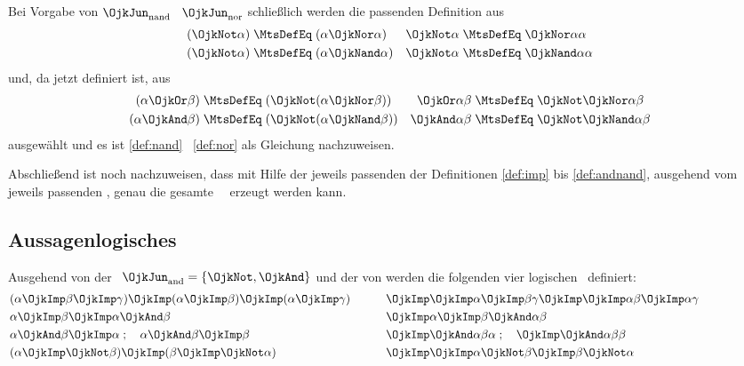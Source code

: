 {Bei Vorgabe von $\OjkJun_{\RawMtsIdxNand}$ \textbzgl\ $\OjkJun_{\RawMtsIdxNor}$ schließlich werden die passenden Definition aus
\begin{align}
(\OjkNot \alpha) & \;\MtsDefEq\; (\alpha \OjkNor \alpha)  &
\OjkNot  \alpha  & \;\MtsDefEq\;  \OjkNor \alpha \alpha   \label{def:notnor} \\
(\OjkNot \alpha) & \;\MtsDefEq\; (\alpha \OjkNand \alpha) &
\OjkNot  \alpha  & \;\MtsDefEq\;  \OjkNand \alpha \alpha  \label{def:notnand}
\end{align}
und, da \chrqt{\OjkNot} jetzt definiert ist, aus
\begin{align}
(\alpha \OjkOr \beta)  & \;\MtsDefEq\; (\OjkNot(\alpha \OjkNor \beta))  &
\OjkOr \alpha  \beta   & \;\MtsDefEq\;  \OjkNot \OjkNor \alpha \beta
\label{def:ornor} \\
(\alpha \OjkAnd \beta) & \;\MtsDefEq\; (\OjkNot(\alpha \OjkNand \beta)) &
\OjkAnd \alpha  \beta  & \;\MtsDefEq\;  \OjkNot \OjkNand \alpha \beta
\label{def:andnand}
\end{align}
ausgewählt und es ist \eqref{def:nand} \textbzgl\ \eqref{def:nor} als Gleichung nachzuweisen.

Abschließend ist noch nachzuweisen, dass mit Hilfe der jeweils passenden der Definitionen \eqref{def:imp} bis \eqref{def:andnand}, ausgehend vom jeweils passenden \OjkForx, genau die gesamte \Formelmenge\ \OjkFor\ erzeugt werden kann.

\subsection[Aussagenlogisches Axiomensystem]{Aussagenlogisches \Axiomensystem}%
\label                   {sub:Axiome}

Ausgehend von der \logischenSignatur\ $\OjkJun_{\RawMtsIdxAnd} = \{\OjkNot, \OjkAnd\}$ und der  von \chrqt{\OjkImp} werden die folgenden vier logischen \Axiome\ definiert:
\begin{align}
&
(\alpha\OjkImp\beta\OjkImp\gamma)\OjkImp(\alpha\OjkImp\beta)\OjkImp(\alpha\OjkImp\gamma)
\formulaspace &
& \OjkImp\OjkImp\alpha\OjkImp\beta\gamma\OjkImp\OjkImp\alpha\beta\OjkImp\alpha\gamma \\
%
& \alpha \OjkImp \beta \OjkImp \alpha \OjkAnd \beta
\formulaspace &
& \OjkImp \alpha \OjkImp \beta \OjkAnd \alpha \beta \\
%
& \alpha \OjkAnd \beta \OjkImp \alpha \;; \quad \alpha \OjkAnd \beta \OjkImp \beta
\formulaspace &
& \OjkImp \OjkAnd \alpha \beta \alpha \;; \quad \OjkImp \OjkAnd \alpha \beta \beta\\
%
&(\alpha \OjkImp \OjkNot \beta) \OjkImp (\beta \OjkImp \OjkNot \alpha)
\formulaspace &
& \OjkImp \OjkImp \alpha \OjkNot \beta \OjkImp \beta \OjkNot \alpha
\formulatoleft
%
\end{align}

}
